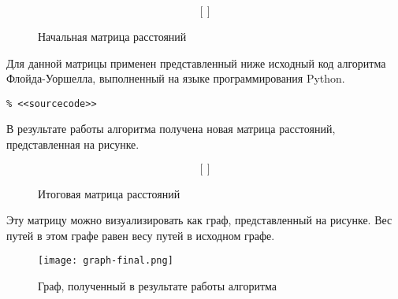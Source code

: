 \documentclass{article}
\begin{document}
\begin{figure}[h]
    \centering
    $$
    \left[
    \right]
    $$
    \caption{Начальная матрица расстояний}
\end{figure}

Для данной матрицы применен представленный ниже исходный код алгоритма Флойда-Уоршелла,
выполненный на языке программирования Python.
\begin{verbatim}
% <<sourcecode>>
\end{verbatim}

В результате работы алгоритма получена новая матрица расстояний, представленная на рисунке.
\begin{figure}[h]
    \centering
    $$
    \left[
    \right]
    $$
    \caption{Итоговая матрица расстояний}
\end{figure}

Эту матрицу можно визуализировать как граф, представленный на рисунке.
Вес путей в этом графе равен весу путей в исходном графе.

\begin{figure}[h]
    \centering
    \texttt{[image: graph-final.png]}
    \caption{Граф, полученный в результате работы алгоритма}
\end{figure}
\end{document}
